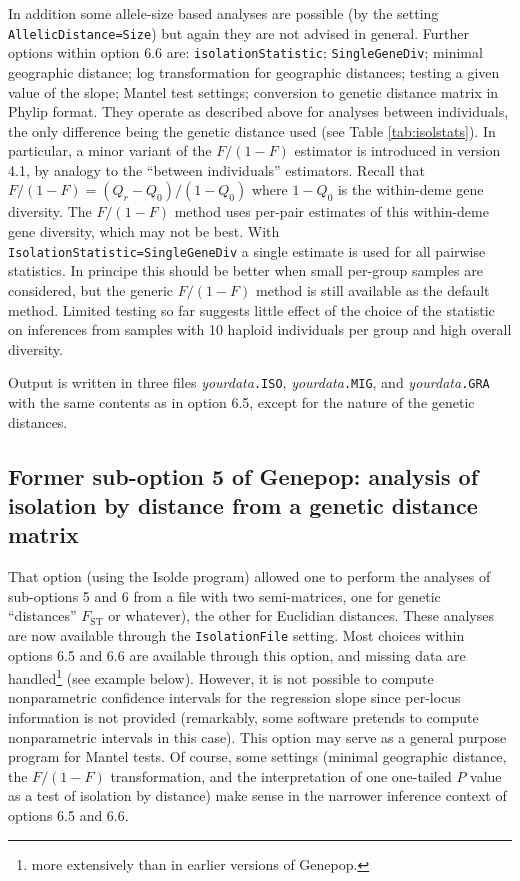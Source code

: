 \documentclass[12pt,]{book}
\let\rmarkdownfootnote\footnote%
\def\footnote{\protect\rmarkdownfootnote}
\begin{document}
In addition some allele-size based analyses are possible (by the setting
\texttt{AllelicDistance=Size}) but again they are not advised in
general. Further options within option 6.6 are:
\texttt{isolationStatistic}; \texttt{SingleGeneDiv}; minimal geographic
distance; log transformation for geographic distances; testing a given
value of the slope; Mantel test settings; conversion to genetic distance
matrix in Phylip format. They operate as described above for analyses
between individuals, the only difference being the genetic distance used
(see Table \ref{tab:isolstats}). In particular, a minor variant of the
\(F/(1-F)\) estimator is introduced in version 4.1, by analogy to the
``between individuals'' estimators. Recall that
\(F/(1-F)=(Q_r-Q_0)/(1-Q_0)\) where \(1-Q_0\) is the within-deme gene
diversity. The \(F/(1-F)\) method uses per-pair estimates of this
within-deme gene diversity, which may not be best. With
\texttt{IsolationStatistic=SingleGeneDiv} a single estimate is used for
all pairwise statistics. In principe this should be better when small
per-group samples are considered, but the generic \(F/(1-F)\) method is
still available as the default method. Limited testing so far suggests
little effect of the choice of the statistic on inferences from samples
with 10 haploid individuals per group and high overall diversity.

Output is written in three files \emph{yourdata}\texttt{.ISO},
\emph{yourdata}\texttt{.MIG}, and \emph{yourdata}\texttt{.GRA} with the
same contents as in option 6.5, except for the nature of the genetic
distances.

\subsection{Former sub-option 5 of Genepop: analysis of isolation by
distance from a genetic distance
matrix}\label{former-sub-option-5-of-genepop-analysis-of-isolation-by-distance-from-a-genetic-distance-matrix}

That option (using the Isolde program) allowed one
to perform the analyses of sub-options 5 and 6 from a file with two
semi-matrices, one for genetic ``distances'' \(F_{\mathrm{ST}}\) or
whatever), the other for Euclidian distances. These analyses are now
available through the
\texttt{IsolationFile} setting. Most
choices within options 6.5 and 6.6 are available through this option,
and missing data are handled\footnote{more extensively than in earlier
  versions of Genepop.} (see example below). However, it is not possible
to compute nonparametric confidence intervals for the regression slope
since per-locus information is not provided (remarkably, some software
pretends to compute nonparametric intervals in this case). This option
may serve as a general purpose program for Mantel tests. Of course, some
settings (minimal geographic distance, the \(F/(1-F)\) transformation,
and the interpretation of one one-tailed \(P\) value as a test of
isolation by distance) make sense in the narrower inference context of
options 6.5 and 6.6.
\end{document}

